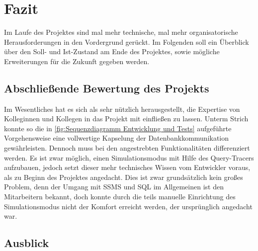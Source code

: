 \documentclass[11pt,toc=sectionentrywithoutdots, 
headheight=44pt, headings=optiontoheadandtoc, hyperfootnotes=false, hypertexnames=false]{scrartcl}
\begin{document}


\section{Fazit}
Im Laufe des Projektes sind mal mehr technische, mal mehr organisatorische Herausforderungen in den Vordergrund gerückt. Im Folgenden soll ein Überblick über den Soll- und Ist-Zustand am Ende des Projektes, sowie mögliche Erweiterungen für die Zukunft gegeben werden.

\subsection{Abschließende Bewertung des Projekts}
Im Wesentliches hat es sich als sehr nützlich herausgestellt, die Expertise von Kolleginnen und Kollegen in das Projekt mit einfließen zu lassen. Unterm Strich konnte so die in \ref{fig:Sequenzdiagramm Entwicklung und Tests} aufgeführte Vorgehensweise eine vollwertige Kapselung der Datenbankkommunikation gewährleisten. Dennoch muss bei den angestrebten Funktionalitäten differenziert werden. Es ist zwar möglich, einen Simulationsmodus mit Hilfe des Query-Tracers aufzubauen, jedoch setzt dieser mehr technisches Wissen vom Entwickler voraus, als zu Beginn des Projektes angedacht. Dies ist zwar grundsätzlich kein großes Problem, denn der Umgang mit SSMS und SQL im Allgemeinen ist den Mitarbeitern bekannt, doch konnte durch die teils manuelle Einrichtung des Simulationsmodus nicht der Komfort erreicht werden, der ursprünglich angedacht war. 

\subsection{Ausblick}
\blindtext


\end{document}
